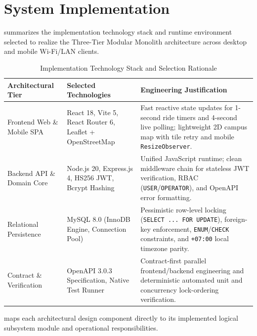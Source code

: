 \section{System Implementation}
\label{sec:implementation}

\label{subsec:tech-stack}
 summarizes the implementation technology stack and runtime environment selected to realize the Three-Tier Modular Monolith architecture across desktop and mobile Wi-Fi/LAN clients.

\begin{table}[H]
  \centering
  \singlespacing\footnotesize
  \caption{Implementation Technology Stack and Selection Rationale}
  \label{tab:tech-stack}
  \renewcommand{\arraystretch}{1.24}
  \begin{tabularx}{\textwidth}{|L{3.3cm}|L{3.6cm}|Y|}
    \hline
    \textbf{Architectural Tier} & \textbf{Selected Technologies} & \textbf{Engineering Justification} \\
    \hline
    Frontend Web \& Mobile SPA & React 18, Vite 5, React Router 6, Leaflet + OpenStreetMap & Fast reactive state updates for 1-second ride timers and 4-second live polling; lightweight 2D campus map with tile retry and mobile \texttt{ResizeObserver}. \\
    \hline
    Backend API \& Domain Core & Node.js 20, Express.js 4, HS256 JWT, Bcrypt Hashing & Unified JavaScript runtime; clean middleware chain for stateless JWT verification, RBAC (\texttt{USER}/\texttt{OPERATOR}), and OpenAPI error formatting. \\
    \hline
    Relational Persistence & MySQL 8.0 (InnoDB Engine, Connection Pool) & Pessimistic row-level locking (\texttt{SELECT ... FOR UPDATE}), foreign-key enforcement, \texttt{ENUM}/\texttt{CHECK} constraints, and \texttt{+07:00} local timezone parity. \\
    \hline
    Contract \& Verification & OpenAPI 3.0.3 Specification, Native Test Runner & Contract-first parallel frontend/backend engineering and deterministic automated unit and concurrency lock-ordering verification. \\
    \hline
  \end{tabularx}
\end{table}

\label{subsec:code-mapping}
 maps each architectural design component directly to its implemented logical subsystem module and operational responsibilities.

